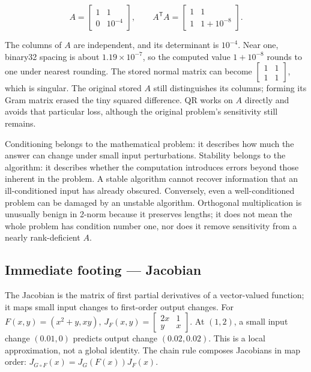 \[
A=\begin{bmatrix}1&1\\0&10^{-4}\end{bmatrix},\qquad
A^\mathsf TA=\begin{bmatrix}1&1\\1&1+10^{-8}\end{bmatrix}.
\]

The columns of \(A\) are independent, and its determinant is \(10^{-4}\). Near one, binary32 spacing is about \(1.19\times10^{-7}\), so the computed value \(1+10^{-8}\) rounds to one under nearest rounding. The stored normal matrix can become \(\begin{bmatrix}1&1\\1&1\end{bmatrix}\), which is singular. The original stored \(A\) still distinguishes its columns; forming its Gram matrix erased the tiny squared difference. QR works on \(A\) directly and avoids that particular loss, although the original problem's sensitivity still remains.

Conditioning belongs to the mathematical problem: it describes how much the answer can change under small input perturbations. Stability belongs to the algorithm: it describes whether the computation introduces errors beyond those inherent in the problem. A stable algorithm cannot recover information that an ill-conditioned input has already obscured. Conversely, even a well-conditioned problem can be damaged by an unstable algorithm. Orthogonal multiplication is unusually benign in 2-norm because it preserves lengths; it does not mean the whole problem has condition number one, nor does it remove sensitivity from a nearly rank-deficient \(A\).

\subsection{Immediate footing --- Jacobian}\label{01-foundations-i-ch020-immediate-footing-jacobian}

The Jacobian is the matrix of first partial derivatives of a vector-valued function; it maps small input changes to first-order output changes. For \(F(x,y)=(x^2+y,xy)\), \(J_F(x,y)=\begin{bmatrix}2x&1\\y&x\end{bmatrix}\). At \((1,2)\), a small input change \((0.01,0)\) predicts output change \((0.02,0.02)\). This is a local approximation, not a global identity. The chain rule composes Jacobians in map order: \(J_{G\circ F}(x)=J_G(F(x))J_F(x)\).

